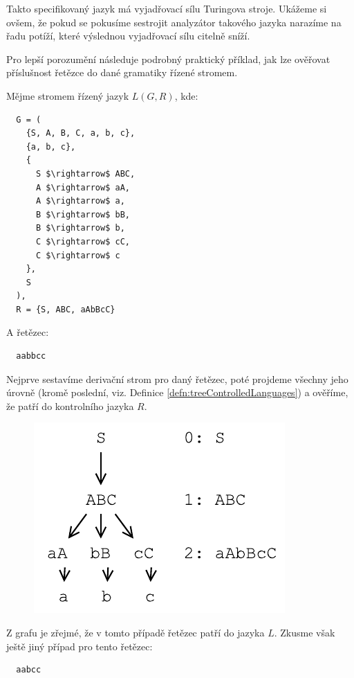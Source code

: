 \noindent
Takto specifikovaný jazyk má vyjadřovací sílu Turingova stroje.\cite{Koutny}
Ukážeme si ovšem, že pokud se pokusíme sestrojit analyzátor takového jazyka
narazíme na řadu potíží, které výslednou vyjadřovací sílu citelně sníží.

Pro lepší porozumění následuje podrobný praktický příklad, jak lze
ověřovat příslušnost řetězce do dané gramatiky řízené stromem.

\begin{exmp}
  Mějme stromem řízený jazyk $L(G, R)$, kde:
  \begin{lstlisting}
  G = (
    {S, A, B, C, a, b, c},
    {a, b, c},
    {
      S $\rightarrow$ ABC,
      A $\rightarrow$ aA,
      A $\rightarrow$ a,
      B $\rightarrow$ bB,
      B $\rightarrow$ b,
      C $\rightarrow$ cC,
      C $\rightarrow$ c
    },
    S
  ),
  R = {S, ABC, aAbBcC}
  \end{lstlisting}
  \noindent
  A řetězec:

  \begin{lstlisting}
  aabbcc
  \end{lstlisting}

  \noindent
  Nejprve sestavíme derivační strom pro daný řetězec, poté projdeme všechny
  jeho úrovně (kromě poslední, viz. Definice \ref{defn:treeControlledLanguages}) a
  ověříme, že patří do kontrolního jazyka $R$.

  \begin{figure}[H]
    \centering
    \includegraphics{fig/TreeControlledGrammar1.pdf}
  \end{figure}

  \noindent
  Z grafu je zřejmé, že v tomto případě řetězec patří do jazyka $L$.
  Zkusme však ještě jiný případ pro tento řetězec:

  \begin{lstlisting}
  aabcc
  \end{lstlisting}


\end{exmp}
